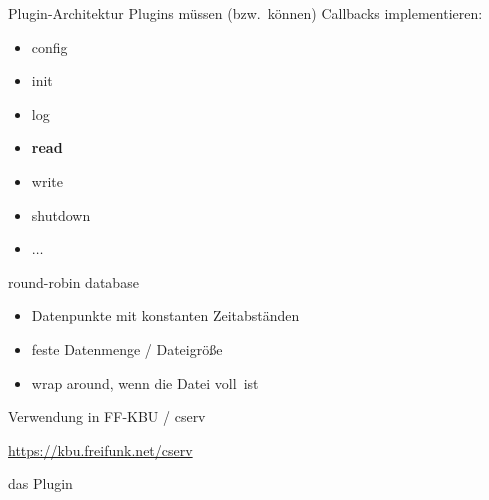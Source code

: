 \documentclass[ngerman,compress,aspectratio=169]{beamer}
\begin{document}
\begin{frame}{Plugin-Architektur}
	Plugins m\"ussen (bzw.\ k\"onnen) Callbacks implementieren:
	\begin{itemize}
		\pause
		\item config
		\pause
		\item init
		\pause
		\item log
		\pause
		\item \textbf{read}
		\pause
		\item write
		\pause
		\item shutdown
		\pause
		\item $\ldots$
	\end{itemize}
\end{frame}

\begin{frame}{round-robin database}
	\begin{itemize}
		\pause
		\item Datenpunkte mit konstanten Zeitabst\"anden
		\pause
		\item feste Datenmenge / Dateigr\"o\ss e
		\pause
		\item \glqq wrap around\grqq, wenn die Datei \glqq voll\grqq\ ist
		\pause
	\end{itemize}
\end{frame}


\begin{frame}{Verwendung in FF-KBU / cserv}
	\begin{center}
		\url{https://kbu.freifunk.net/cserv}
	\end{center}
\end{frame}

\begin{frame}
	\begin{center}
		\large{das Plugin}
	\end{center}
\end{frame}
\end{document}
